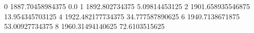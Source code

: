 0 1887.70458984375 0.0
1 1892.802734375 5.09814453125
2 1901.658935546875 13.954345703125
4 1922.482177734375 34.777587890625
6 1940.7138671875 53.00927734375
8 1960.31494140625 72.6103515625
